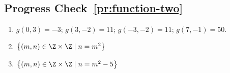 \subsection*{Progress Check~\ref{pr:function-two}}
\begin{enumerate}
\item $g ( 0, 3 ) = -3$; $g ( 3, -2 ) = 11$; 
$g ( -3, -2 ) = 11$; $g ( 7, -1 ) = 50$.

\item $\left\{ (m, n) \in \Z \times \Z \mid n = m^2 \right\}$
\item $\left\{ (m, n) \in \Z \times \Z \mid n = m^2 - 5 \right\}$
\end{enumerate}
\hbreak


\endinput

